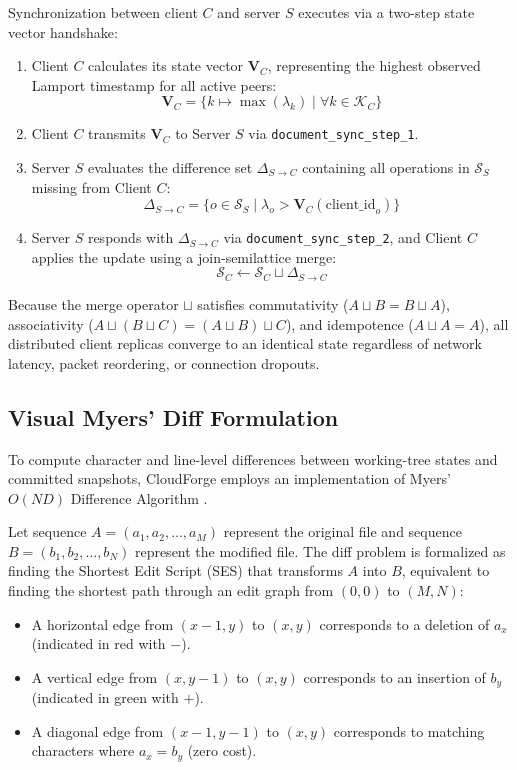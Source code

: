 \documentclass[conference]{IEEEtran}
\begin{document}
Synchronization between client $C$ and server $S$ executes via a two-step state vector handshake:
\begin{enumerate}
    \item Client $C$ calculates its state vector $\mathbf{V}_C$, representing the highest observed Lamport timestamp for all active peers:
    \begin{equation}
        \mathbf{V}_C = \{k \mapsto \max(\lambda_k) \mid \forall k \in \mathcal{K}_C\}
    \end{equation}
    \item Client $C$ transmits $\mathbf{V}_C$ to Server $S$ via \texttt{document\_sync\_step\_1}.
    \item Server $S$ evaluates the difference set $\Delta_{S \to C}$ containing all operations in $\mathcal{S}_S$ missing from Client $C$:
    \begin{equation}
        \Delta_{S \to C} = \{o \in \mathcal{S}_S \mid \lambda_o > \mathbf{V}_C(\text{client\_id}_o)\}
    \end{equation}
    \item Server $S$ responds with $\Delta_{S \to C}$ via \texttt{document\_sync\_step\_2}, and Client $C$ applies the update using a join-semilattice merge:
    \begin{equation}
        \mathcal{S}_C \leftarrow \mathcal{S}_C \sqcup \Delta_{S \to C}
    \end{equation}
\end{enumerate}

Because the merge operator $\sqcup$ satisfies commutativity ($A \sqcup B = B \sqcup A$), associativity ($A \sqcup (B \sqcup C) = (A \sqcup B) \sqcup C$), and idempotence ($A \sqcup A = A$), all distributed client replicas converge to an identical state regardless of network latency, packet reordering, or connection dropouts.

\subsection{Visual Myers' Diff Formulation}
To compute character and line-level differences between working-tree states and committed snapshots, CloudForge employs an implementation of Myers' $O(ND)$ Difference Algorithm \cite{myers1986}.

Let sequence $A = (a_1, a_2, \dots, a_M)$ represent the original file and sequence $B = (b_1, b_2, \dots, b_N)$ represent the modified file. The diff problem is formalized as finding the Shortest Edit Script (SES) that transforms $A$ into $B$, equivalent to finding the shortest path through an edit graph from $(0, 0)$ to $(M, N)$:
\begin{itemize}
    \item A horizontal edge from $(x-1, y)$ to $(x, y)$ corresponds to a deletion of $a_x$ (indicated in red with $-$).
    \item A vertical edge from $(x, y-1)$ to $(x, y)$ corresponds to an insertion of $b_y$ (indicated in green with $+$).
    \item A diagonal edge from $(x-1, y-1)$ to $(x, y)$ corresponds to matching characters where $a_x = b_y$ (zero cost).
\end{itemize}
\end{document}
